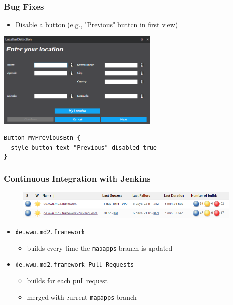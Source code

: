 \begin{frame}[fragile]
    \frametitle{Bug Fixes}

\begin{itemize}
  \item Disable a button \tiny{(e.g., "Previous" button in first view)}  
\end{itemize}

\begin{center}
\includegraphics[width=0.6\textwidth] {images/disabled-previous-button.png}
\end{center}

\vspace{-1ex}

\begin{lstlisting}[basicstyle=\footnotesize\ttfamily]
Button MyPreviousBtn { 
  style button text "Previous" disabled true
}
\end{lstlisting}

\end{frame}	


\begin{frame}
    \frametitle{Continuous Integration with Jenkins}
    
    \begin{figure}
    	\includegraphics[width= 0.9\linewidth]{images/jenkins-jobs.png}
    \end{figure}
    
    \vspace{-1ex}
    
    \begin{itemize}
       \item \texttt{de.wwu.md2.framework}
       \begin{itemize}
           \item builds every time the \texttt{mapapps} branch is updated
       \end{itemize}
       \item \texttt{de.wwu.md2.framework-Pull-Requests} 
       \begin{itemize}
           \item builds for each pull request
           \item merged with current \texttt{mapapps} branch
       \end{itemize}
    \end{itemize}
\end{frame}

